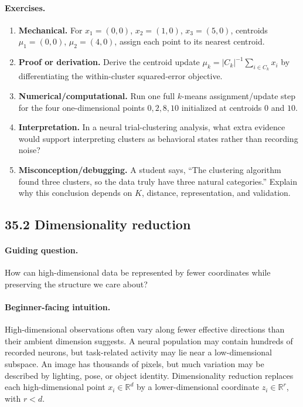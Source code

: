 \paragraph{Exercises.}
\begin{enumerate}[label=\textbf{35.1.\arabic*.}, leftmargin=*]
\item \textbf{Mechanical.} For \(x_1=(0,0)\), \(x_2=(1,0)\), \(x_3=(5,0)\), centroids \(\mu_1=(0,0)\), \(\mu_2=(4,0)\), assign each point to its nearest centroid.
\item \textbf{Proof or derivation.} Derive the centroid update \(\mu_k=|C_k|^{-1}\sum_{i\in C_k}x_i\) by differentiating the within-cluster squared-error objective.
\item \textbf{Numerical/computational.} Run one full \(k\)-means assignment/update step for the four one-dimensional points \(0,2,8,10\) initialized at centroids \(0\) and \(10\).
\item \textbf{Interpretation.} In a neural trial-clustering analysis, what extra evidence would support interpreting clusters as behavioral states rather than recording noise?
\item \textbf{Misconception/debugging.} A student says, ``The clustering algorithm found three clusters, so the data truly have three natural categories.'' Explain why this conclusion depends on \(K\), distance, representation, and validation.
\end{enumerate}

\subsection{35.2 Dimensionality reduction}

\paragraph{Guiding question.}
How can high-dimensional data be represented by fewer coordinates while preserving the structure we care about?

\paragraph{Beginner-facing intuition.}
High-dimensional observations often vary along fewer effective directions than their ambient dimension suggests. A neural population may contain hundreds of recorded neurons, but task-related activity may lie near a low-dimensional subspace. An image has thousands of pixels, but much variation may be described by lighting, pose, or object identity. Dimensionality reduction replaces each high-dimensional point \(x_i\in\mathbb R^d\) by a lower-dimensional coordinate \(z_i\in\mathbb R^r\), with \(r<d\).

